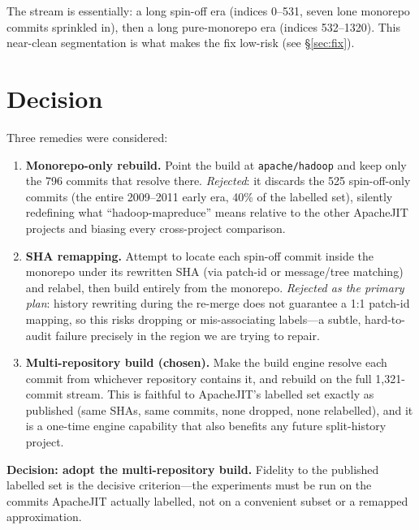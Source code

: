 \documentclass[11pt]{article}
\newcommand{\code}[1]{\texttt{#1}}
\begin{document}
The stream is essentially: a long spin-off era (indices 0--531, seven lone
monorepo commits sprinkled in), then a long pure-monorepo era (indices
532--1320). This near-clean segmentation is what makes the fix low-risk (see
\S\ref{sec:fix}).

\section{Decision}
Three remedies were considered:

\begin{enumerate}
  \item \textbf{Monorepo-only rebuild.} Point the build at \code{apache/hadoop}
  and keep only the 796 commits that resolve there. \emph{Rejected}: it discards
  the 525 spin-off-only commits (the entire 2009--2011 early era, 40\% of the
  labelled set), silently redefining what ``hadoop-mapreduce'' means relative to
  the other ApacheJIT projects and biasing every cross-project comparison.

  \item \textbf{SHA remapping.} Attempt to locate each spin-off commit inside the
  monorepo under its rewritten SHA (via patch-id or message/tree matching) and
  relabel, then build entirely from the monorepo. \emph{Rejected as the primary
  plan}: history rewriting during the re-merge does not guarantee a 1:1
  patch-id mapping, so this risks dropping or mis-associating labels---a subtle,
  hard-to-audit failure precisely in the region we are trying to repair.

  \item \textbf{Multi-repository build (chosen).} Make the build engine resolve
  each commit from whichever repository contains it, and rebuild on the full
  1{,}321-commit stream. This is faithful to ApacheJIT's labelled set exactly as
  published (same SHAs, same commits, none dropped, none relabelled), and it is a
  one-time engine capability that also benefits any future split-history project.
\end{enumerate}

\textbf{Decision: adopt the multi-repository build.} Fidelity to the published
labelled set is the decisive criterion---the experiments must be run on the
commits ApacheJIT actually labelled, not on a convenient subset or a remapped
approximation.

\end{document}
